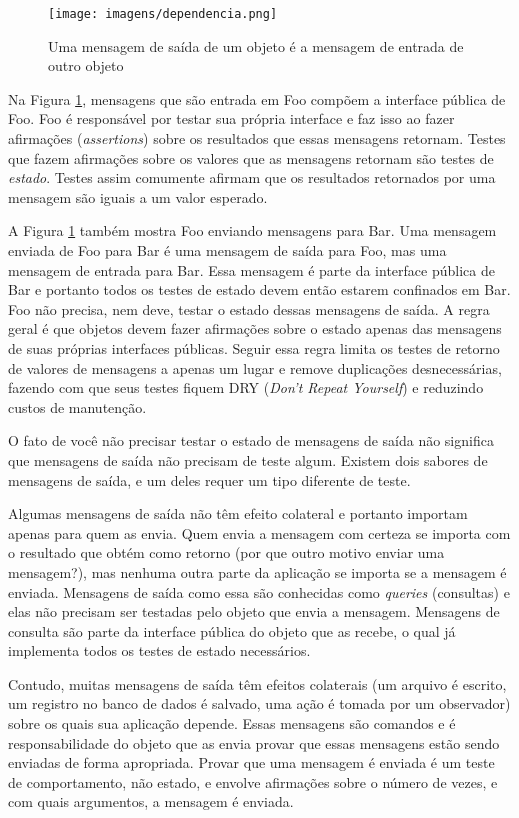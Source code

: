 \begin{figure}[!htbp]
  \center
  \texttt{[image: imagens/dependencia.png]}
  \caption{Uma mensagem de saída de um objeto é a mensagem de entrada de outro objeto}
  \label{img:dependencia}
\end{figure}

Na Figura \ref{img:dependencia}, mensagens que são entrada em Foo compõem a interface pública de Foo. Foo é responsável por testar sua própria interface e faz isso ao fazer afirmações (\textit{assertions}) sobre os resultados que essas mensagens retornam. Testes que fazem afirmações sobre os valores que as mensagens retornam são testes de \textit{estado}. Testes assim comumente afirmam que os resultados retornados por uma mensagem são iguais a um valor esperado.

A Figura \ref{img:dependencia} também mostra Foo enviando mensagens para Bar. Uma mensagem enviada de Foo para Bar é uma mensagem de saída para Foo, mas uma mensagem de entrada para Bar. Essa mensagem é parte da interface pública de Bar e portanto todos os testes de estado devem então estarem confinados em Bar. Foo não precisa, nem deve, testar o estado dessas mensagens de saída. A regra geral é que objetos devem fazer afirmações sobre o estado apenas das mensagens de suas próprias interfaces públicas. Seguir essa regra limita os testes de retorno de valores de mensagens a apenas um lugar e remove duplicações desnecessárias, fazendo com que seus testes fiquem DRY (\textit{Don't Repeat Yourself}) e reduzindo custos de manutenção.

O fato de você não precisar testar o estado de mensagens de saída não significa que mensagens de saída não precisam de teste algum. Existem dois sabores de mensagens de saída, e um deles requer um tipo diferente de teste.

Algumas mensagens de saída não têm efeito colateral e portanto importam apenas para quem as envia. Quem envia a mensagem com certeza se importa com o resultado que obtém como retorno (por que outro motivo enviar uma mensagem?), mas nenhuma outra parte da aplicação se importa se a mensagem é enviada. Mensagens de saída como essa são conhecidas como \textit{queries} (consultas) e elas não precisam ser testadas pelo objeto que envia a mensagem. Mensagens de consulta são parte da interface pública do objeto que as recebe, o qual já implementa todos os testes de estado necessários.

Contudo, muitas mensagens de saída têm efeitos colaterais (um arquivo é escrito, um registro no banco de dados é salvado, uma ação é tomada por um observador) sobre os quais sua aplicação depende. Essas mensagens são comandos e é responsabilidade do objeto que as envia provar que essas mensagens estão sendo enviadas de forma apropriada. Provar que uma mensagem é enviada é um teste de comportamento, não estado, e envolve afirmações sobre o número de vezes, e com quais argumentos, a mensagem é enviada.

